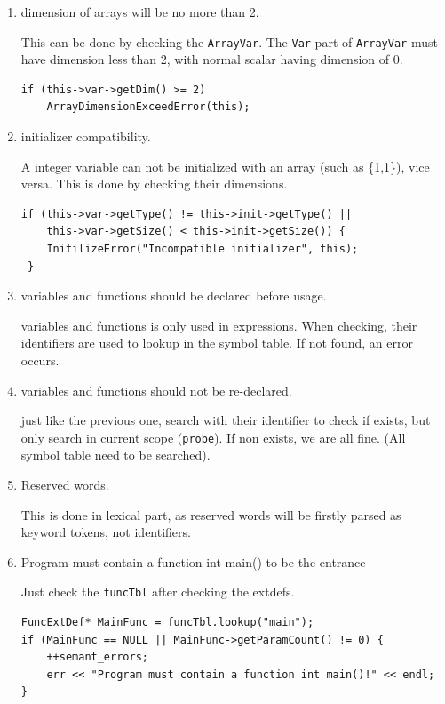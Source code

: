 \documentclass[11pt]{article}
\begin{document}
\begin{enumerate}
\item dimension of arrays will be no more than 2.

This can be done by checking the \texttt{ArrayVar}. The \texttt{Var} part of \texttt{ArrayVar}
must have dimension less than 2, with normal scalar having dimension of 0.
\begin{verbatim}
if (this->var->getDim() >= 2)
    ArrayDimensionExceedError(this);
\end{verbatim}

\item initializer compatibility.

A integer variable can not be initialized with an array (such as \{1,1\}),
vice versa. This is done by checking their dimensions.
\begin{verbatim}
if (this->var->getType() != this->init->getType() || 
    this->var->getSize() < this->init->getSize()) {
    InitilizeError("Incompatible initializer", this);
 }
\end{verbatim}

\item variables and functions should be declared before usage.

variables and functions is only used in expressions. When checking, their
identifiers are used to lookup in the symbol table. If not found, an
error occurs.

\item variables and functions should not be re-declared.

just like the previous one, search with their identifier to check if
exists, but only search in current scope (\texttt{probe}). If non exists, we are
all fine. (All symbol table need to be searched).

\item Reserved words.

This is done in lexical part, as reserved words will be firstly parsed as
keyword tokens, not identifiers.

\item Program must contain a function int main() to be the entrance

Just check the \texttt{funcTbl} after checking the extdefs.
\begin{verbatim}
FuncExtDef* MainFunc = funcTbl.lookup("main");
if (MainFunc == NULL || MainFunc->getParamCount() != 0) {
    ++semant_errors;
    err << "Program must contain a function int main()!" << endl;
}
\end{verbatim}


\end{enumerate}
\end{document}
